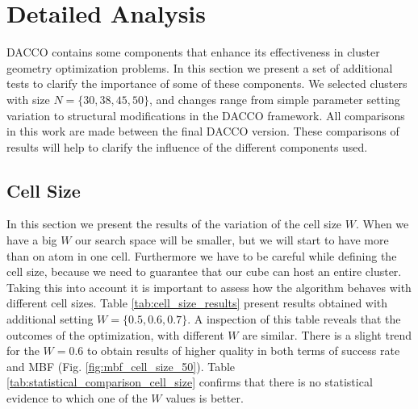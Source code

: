 		\pagebreak
		\section{Detailed Analysis}
		\label{sec:detailed_analysis}
		
		DACCO contains some components that enhance its effectiveness in cluster geometry optimization problems. In this section we present a set of additional tests to clarify the importance of some of these components. We selected clusters with size $N=\{30, 38, 45, 50\}$, and changes range from simple parameter setting variation to structural modifications in the DACCO framework. All comparisons in this work are made between the final DACCO version. These comparisons of results will help to clarify the influence of the different components used.
		
		
		\subsection{Cell Size}
		In this section we present the results of the variation of the cell size $W$. When we have a big $W$ our search space will be smaller, but we will start to have more than on atom in one cell. Furthermore we have to be careful while defining the cell size, because we need to guarantee that our cube can host an entire cluster. Taking this into account it is important to assess how the algorithm behaves with different cell sizes.
		Table \ref{tab:cell_size_results} present results obtained with additional setting $W=\{0.5, 0.6, 0.7\}$. A inspection of this table reveals that the outcomes of the optimization, with different $W$ are similar.
		There is a slight trend for the $W=0.6$ to obtain results of higher quality in both terms of success rate and MBF (Fig. \ref{fig:mbf_cell_size_50}).
		Table \ref{tab:statistical_comparison_cell_size} confirms that there is no statistical evidence to which one of the $W$ values is better.
		   		
